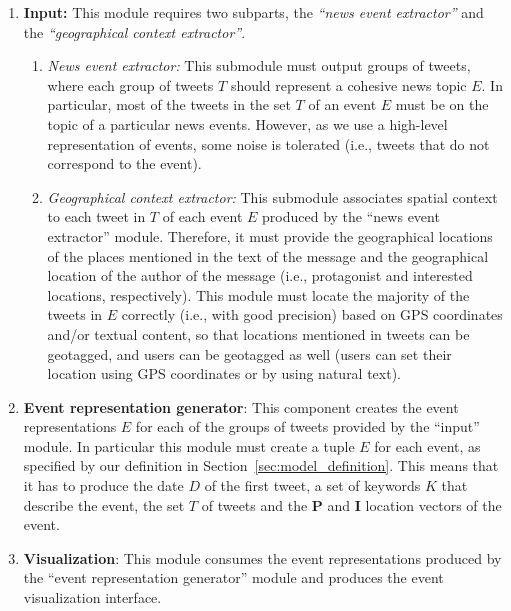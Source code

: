 \begin{enumerate}

\item{\bf Input:} This module requires two subparts, the {\em ``news event
extractor''} and the {\em ``geographical context extractor''}.
\begin{enumerate}

\item{\em News event extractor:} This submodule must output groups
of tweets, where each group of tweets $T$ should represent a cohesive news
topic $E$.  In particular, most of the tweets in the set $T$ of an event $E$
must be on the topic of a particular news events. However, as we
use a high-level representation of events, some noise is tolerated (i.e.,
tweets that do not correspond to the event).

\item{\em Geographical context extractor:} This submodule
associates spatial context to each tweet in $T$ of each event $E$ produced
by the ``news event extractor'' module. Therefore, it must provide the
geographical locations of the places mentioned in the text of the message and the
geographical location of the author of the message (i.e., protagonist and interested
locations, respectively). This module must locate the majority of the tweets in $E$
correctly (i.e., with good precision) based on GPS coordinates and/or textual
content, so that locations mentioned in tweets can be geotagged, and users
can be geotagged as well
(users can set their location using GPS coordinates or
by using natural text).

\end{enumerate}
\item{\bf Event representation generator}: This component creates the event
representations $E$ for each of the groups of tweets provided by the
``input'' module. In particular this module must create a tuple $E$ for each
event, as specified by our definition in Section~\ref{sec:model_definition}.
This means that it has to produce the date $D$ of the first tweet, a set of keywords
$K$ that describe the event, the set $T$ of tweets and the $\mathbf{P}$ and
$\mathbf{I}$ location vectors of the event.

\item{\bf Visualization}: This module consumes the event
representations produced by the ``event representation generator'' module and
produces the event visualization interface.

\end{enumerate}



